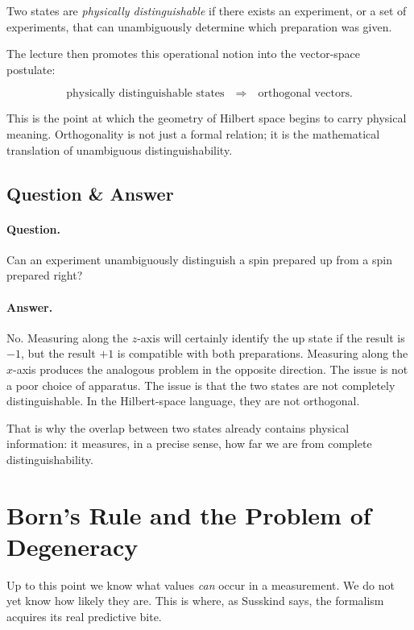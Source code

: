 \begin{definition}
Two states are \emph{physically distinguishable} if there exists an experiment, or a set of experiments, that can unambiguously determine which preparation was given.
\end{definition}

The lecture then promotes this operational notion into the vector-space postulate:

\begin{equation}
\text{physically distinguishable states} \quad \Longrightarrow \quad \text{orthogonal vectors.}
\end{equation}

This is the point at which the geometry of Hilbert space begins to carry physical meaning. Orthogonality is not just a formal relation; it is the mathematical translation of unambiguous distinguishability.

\subsection{Question \& Answer}

\paragraph{Question.} Can an experiment unambiguously distinguish a spin prepared up from a spin prepared right?

\paragraph{Answer.} No. Measuring along the \(z\)-axis will certainly identify the up state if the result is \(-1\), but the result \(+1\) is compatible with both preparations. Measuring along the \(x\)-axis produces the analogous problem in the opposite direction. The issue is not a poor choice of apparatus. The issue is that the two states are not completely distinguishable. In the Hilbert-space language, they are not orthogonal.

That is why the overlap between two states already contains physical information: it measures, in a precise sense, how far we are from complete distinguishability.

\section{Born's Rule and the Problem of Degeneracy}

Up to this point we know what values \emph{can} occur in a measurement. We do not yet know how likely they are. This is where, as Susskind says, the formalism acquires its real predictive bite.

